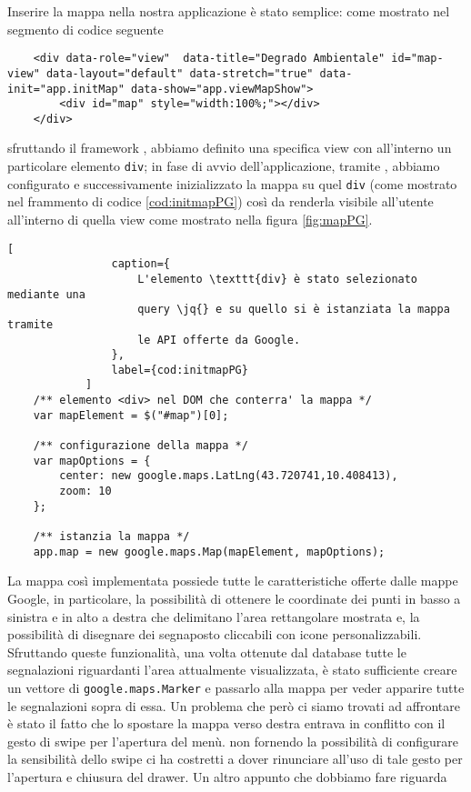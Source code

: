			Inserire la mappa nella nostra applicazione \pg{} è stato semplice:
			come mostrato nel segmento di codice seguente
			\begin{lstlisting}
	<div data-role="view"  data-title="Degrado Ambientale" id="map-view" data-layout="default" data-stretch="true" data-init="app.initMap" data-show="app.viewMapShow">
		<div id="map" style="width:100%;"></div>
	</div>
			\end{lstlisting}
			sfruttando il framework \kendomob{}, abbiamo definito una specifica
			view con all'interno un particolare elemento \texttt{div}; in fase di
			avvio dell'applicazione, tramite \js{}, abbiamo configurato e
			successivamente inizializzato la mappa su quel \texttt{div} (come
			mostrato nel frammento di codice \ref{cod:initmapPG}) così
			da renderla visibile all'utente all'interno di quella view come
			mostrato nella figura \ref{fig:mapPG}.
			\begin{lstlisting}[
				caption={
				    L'elemento \texttt{div} è stato selezionato mediante una
				    query \jq{} e su quello si è istanziata la mappa tramite
				    le API offerte da Google.
				},
				label={cod:initmapPG}
			]
	/** elemento <div> nel DOM che conterra' la mappa */
	var mapElement = $("#map")[0];

	/** configurazione della mappa */
	var mapOptions = {
		center: new google.maps.LatLng(43.720741,10.408413),
		zoom: 10
	};

	/** istanzia la mappa */
	app.map = new google.maps.Map(mapElement, mapOptions);
			\end{lstlisting}
			La mappa così implementata possiede tutte le caratteristiche offerte
			dalle mappe Google, in particolare, la possibilità di ottenere le
			coordinate dei punti in basso a sinistra e in alto a destra che
			delimitano l'area rettangolare mostrata e, la possibilità di
			disegnare dei segnaposto cliccabili con icone personalizzabili.
			Sfruttando queste funzionalità, una volta ottenute dal database
			tutte le segnalazioni riguardanti l'area attualmente visualizzata, è
			stato sufficiente creare un vettore di \texttt{google.maps.Marker} e
			passarlo alla mappa per	veder apparire tutte le segnalazioni sopra
			di essa. Un problema che però ci siamo trovati ad affrontare è stato
			il fatto che lo spostare la mappa verso destra entrava in conflitto
			con il gesto di swipe per l'apertura del menù. \kendomob{} non
			fornendo la possibilità di configurare la sensibilità dello swipe ci
			ha costretti a dover rinunciare all'uso di tale gesto per l'apertura
			e chiusura del drawer. Un altro appunto che dobbiamo fare riguarda

